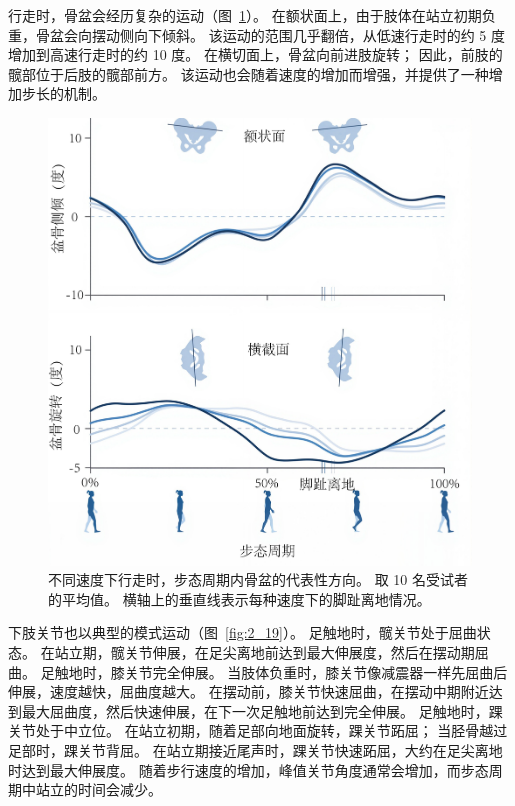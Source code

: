 行走时，骨盆会经历复杂的运动（图~\ref{fig:2_18}）。
在额状面上，由于肢体在站立初期负重，骨盆会向摆动侧向下倾斜。
该运动的范围几乎翻倍，从低速行走时的约 5 度增加到高速行走时的约 10 度。
在横切面上，骨盆向前进肢旋转；
因此，前肢的髋部位于后肢的髋部前方。
该运动也会随着速度的增加而增强，并提供了一种增加步长的机制。


\begin{figure}[!htb]
	\centering
	\includegraphics[width=0.8\linewidth]{chap2/2_18}
	\caption{不同速度下行走时，步态周期内骨盆的代表性方向。
		取 10 名受试者的平均值。
		横轴上的垂直线表示每种速度下的脚趾离地情况\cite{arnold2013muscle}。 \label{fig:2_18}}
\end{figure}


下肢关节也以典型的模式运动（图~\ref{fig:2_19}）。
足触地时，髋关节处于屈曲状态。
在站立期，髋关节伸展，在足尖离地前达到最大伸展度，然后在摆动期屈曲。
足触地时，膝关节完全伸展。
当肢体负重时，膝关节像减震器一样先屈曲后伸展，速度越快，屈曲度越大。
在摆动前，膝关节快速屈曲，在摆动中期附近达到最大屈曲度，然后快速伸展，在下一次足触地前达到完全伸展。
足触地时，踝关节处于中立位。
在站立初期，随着足部向地面旋转，踝关节跖屈；
当胫骨越过足部时，踝关节背屈。
在站立期接近尾声时，踝关节快速跖屈，大约在足尖离地时达到最大伸展度。
随着步行速度的增加，峰值关节角度通常会增加，而步态周期中站立的时间会减少。


